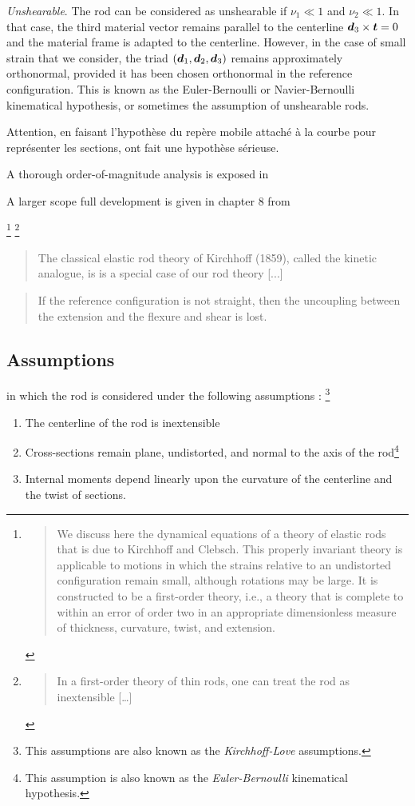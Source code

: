 \emph{Unshearable}. The rod can be considered as unshearable if $\nu_1 \ll 1$ and $\nu_2 \ll 1$. In that case, the third material vector remains parallel to the centerline  $\boldsymbol{d}_3 \times \boldsymbol{t} = 0$ and the material frame is adapted to the centerline. 
However, in the case of small strain that we consider, the triad $(\boldsymbol{d}_1,\boldsymbol{d}_2,\boldsymbol{d}_3)$ remains approximately orthonormal, provided it has been chosen orthonormal in the reference configuration. This is known as the Euler-Bernoulli or Navier-Bernoulli kinematical hypothesis, or sometimes the assumption of unshearable rods. 



Attention, en faisant l'hypothèse du repère mobile attaché à la courbe pour représenter les sections, ont fait une hypothèse sérieuse.

A thorough order-of-magnitude analysis is exposed in \cite{Dill1992, Coleman1993}

A larger scope full development is given in chapter 8 from \cite[pp.~270-274]{Antman2005}

\footnote{\blockcquote[p.~1]{Coleman1993}{We discuss here the dynamical equations of a theory of elastic rods that is due to Kirchhoff and Clebsch. This properly invariant theory is applicable to motions in which the strains relative to an undistorted configuration remain small, although rotations may be large. It is constructed to be a first-order theory, i.e., a theory that is complete to within an error of order two in an appropriate dimensionless measure of thickness, curvature, twist, and extension.}}
\footnote{\blockcquote[p.~1]{Coleman1993}{In a first-order theory of thin rods, one can treat the rod as inextensible [\dots]}}


\blockcquote[p.~238]{Antman2005}{The classical elastic rod theory of Kirchhoff (1859), called the kinetic analogue, is is a special case of our rod theory [...]}

\blockcquote[p.~341]{Antman2005}{If the reference configuration is not straight, then the uncoupling between the extension and the flexure and shear is lost.}



\subsection{Assumptions}

in which the rod is considered under the following assumptions : \footnote{This assumptions are also known as the \emph{Kirchhoff-Love} assumptions.}
\begin{enumerate}
\item The centerline of the rod is inextensible
\item Cross-sections remain plane, undistorted, and normal to the axis of the rod\footnote{This assumption is also known as the \emph{Euler-Bernoulli} kinematical hypothesis.}
\item Internal moments depend linearly upon the curvature of the centerline and the twist of sections.
\end{enumerate}



